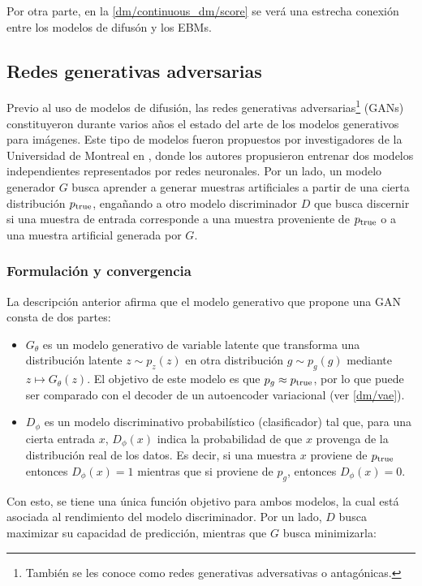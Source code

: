 Por otra parte, en la \autoref{dm/continuous_dm/score} se verá una estrecha conexión entre los modelos de difusón y los EBMs.

\subsection{Redes generativas adversarias}
\label{dm/generative_models/gans}

Previo al uso de modelos de difusión, las redes generativas adversarias\footnote{También se les conoce como redes generativas adversativas o antagónicas.} (GANs) constituyeron durante varios años el estado del arte de los modelos generativos para imágenes. Este tipo de modelos fueron propuestos por investigadores de la Universidad de Montreal en \cite{goodfellow2014generative}, donde los autores propusieron entrenar dos modelos independientes representados por redes neuronales. Por un lado, un modelo generador $G$ busca aprender a generar muestras artificiales a partir de una cierta distribución $p_{\operatorname{true}}$, engañando a otro modelo discriminador $D$ que busca discernir si una muestra de entrada corresponde a una muestra proveniente de $p_{\operatorname{true}}$ o a una muestra artificial generada por $G$.

\subsubsection{Formulación y convergencia}

La descripción anterior afirma que el modelo generativo que propone una GAN consta de dos partes:

\begin{itemize}
	\item $G_\theta$ es un modelo generativo de variable latente que transforma una distribución latente $z\sim p_z(z)$ en otra distribución $g\sim p_g(g)$ mediante $z\mapsto G_\theta(z)$. El objetivo de este modelo es que $p_g\approx p_{\operatorname{true}}$, por lo que puede ser comparado con el decoder de un autoencoder variacional (ver \autoref{dm/vae}).
	\item $D_\phi$ es un modelo discriminativo probabilístico (clasificador) tal que, para una cierta entrada $x$, $D_\phi(x)$ indica la probabilidad de que $x$ provenga de la distribución real de los datos. Es decir, si una muestra $x$ proviene de $p_{\operatorname{true}}$ entonces $D_\phi(x)=1$ mientras que si proviene de $p_g$, entonces $D_\phi(x)=0$. \end{itemize}

Con esto, se tiene una única función objetivo para ambos modelos, la cual está asociada al rendimiento del modelo discriminador. Por un lado, $D$ busca maximizar su capacidad de predicción, mientras que $G$ busca minimizarla:

